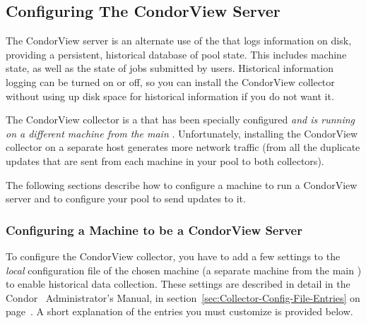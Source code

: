 \subsection{\label{sec:Contrib-CondorView-Install}
Configuring The CondorView Server}

The CondorView server is an alternate use of the
that logs information on disk, providing a 
persistent, historical database of pool state.
This includes machine state, as well as the state of jobs submitted by
users.
Historical information logging can be turned on or off, so you can
install the CondorView collector without using up disk space for
historical information if you do not want it.

The CondorView collector is a  that has been specially 
configured \emph{and is running on a different machine from the main
}.
Unfortunately, installing the CondorView collector on a separate host
generates more network traffic (from all the duplicate updates that
are sent from each machine in your pool to both collectors).

The following sections describe how to configure a machine to run a
CondorView server and to configure your pool to send updates to it. 


\subsubsection{\label{sec:CondorView-Server-Setup}
Configuring a Machine to be a CondorView Server} 


To configure the CondorView collector, you have to add a few settings
to the \emph{local} configuration file of the chosen machine (a
separate machine from the main ) to enable
historical data collection.
These settings are described in detail in the Condor \VersionNotice\ 
Administrator's Manual, in
section~\ref{sec:Collector-Config-File-Entries} on
page~\pageref{sec:Collector-Config-File-Entries}.
A short explanation of the entries you must customize is provided
below.

